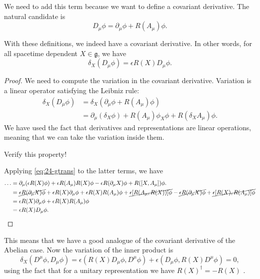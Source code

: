We need to add this term because we want to define a covariant derivative.
The natural candidate is
\begin{equation}
  \boxed{D_{\mu} \phi = \partial_{\mu} \phi + R(A_{\mu}) \phi}.
\end{equation}
\begin{claim}
  With these definitions, we indeed have a covariant derivative. In other words, for all spacetime dependent $X \in \mathfrak{g}$, we have
  \begin{equation}
    \delta_X(D_{\mu} \phi) = \epsilon R(X) D_{\mu} \phi.
  \end{equation}
\end{claim}
\begin{proof}
  We need to compute the variation in the covariant derivative. Variation is a linear operator satisfying the Leibniz rule:
  \begin{align}
    \delta_X (D_{\mu} \phi) &= \delta_X (\partial_{\mu} \phi + R(A_{\mu}) \phi) \\
			    &= \partial_{\mu}(\delta_X \phi) + R(A_{\mu}) \phi_X \phi + R(\delta_X A_{\mu}) \phi.
  \end{align}
  We have used the fact that derivatives and representations are linear operations, meaning that we can take the variation inside them.
  \begin{exercise}
    Verify this property!
  \end{exercise}
  Applying \eqref{eq:24-gtrans} to the latter terms, we have
  \begin{align}
    \dots &= \partial_{\mu} ( \epsilon R(X) \phi) + \epsilon R(A_{\mu})R(X) \phi - \epsilon R(\partial_{\mu} X) \phi + R([X, A_{\mu}])\phi. \\
	  &= \cancel{\epsilon R(\partial_{\mu} X) \phi} + \epsilon R(X) \partial_{\mu} \phi + \epsilon R(X) R(A_{\mu}) \phi + \cancel{\epsilon [R(A_{\mu}, R(X))] \phi} - \cancel{\epsilon R(\partial_{\mu} X) \phi} + \cancel{\epsilon [R(X), R(A_{\mu})]\phi} \\
	  &= \epsilon R(X) \partial_{\mu} \phi + \epsilon R(X) R(A_{\mu}) \phi \\
	  &= \epsilon R(X) D_{\mu} \phi.
  \end{align}
\end{proof}
This means that we have a good analogue of the covariant derivative of the Abelian case.
Now the variation of the inner product is
\begin{equation}
  \delta_X (D^{\mu} \phi, D_{\mu} \phi)= \epsilon (R(X) D_{\mu} \phi, D^{\mu} \phi) + \epsilon (D_{\mu} \phi, R(X) D^{\mu} \phi) = 0,
\end{equation}
using the fact that for a unitary representation we have $R(X)^{\dagger} = - R(X)$ .

